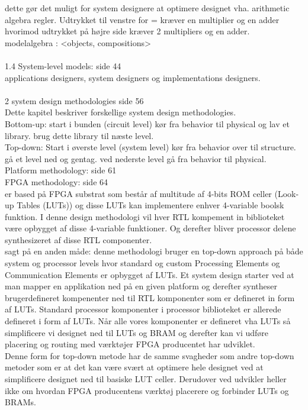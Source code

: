 dette gør det muligt for system designere at optimere designet vha. arithmetic algebra regler. Udtrykket til venstre for = kræver en multiplier og en adder hvorimod udtrykket på højre side kræver 2 multipliers og en adder.\\
modelalgebra : <objects, compositions>\\
\\
1.4 System-level models: side 44\\
applications designers, system designers og implementations designers.\\
\\
2 system design methodologies side 56\\
Dette kapitel beskriver forskellige system design methodologies.\\
Bottom-up: start i bunden (circuit level) kør fra behavior til physical og lav et library. brug dette library til næste level.\\
Top-down: Start i øverste level (system level) kør fra behavior over til structure. gå et level ned og gentag. ved nederste level gå fra behavior til physical.\\
Platform methodology: side 61\\
FPGA methodology: side 64\\
er based på FPGA substrat som består af multitude af 4-bits ROM celler (Look-up Tables (LUTs)) og disse LUTs kan implementere enhver 4-variable boolsk funktion. I denne design methodologi vil hver RTL kompement in biblioteket være opbygget af disse 4-variable funktioner. Og derefter bliver processor delene synthesizeret af disse RTL componenter.\\
sagt på en anden måde: denne methodologi bruger en top-down approach på både system og processor levels hvor standard og custom Processing Elements og Communication Elements er opbygget af LUTs. Et system design starter ved at man mapper en applikation ned på en given platform og derefter syntheser brugerdefineret kompenenter ned til RTL komponenter som er defineret in form af LUTs. Standard processor komponenter i processor biblioteket er allerede defineret i form af LUTs. Når alle vores komponenter er defineret vha LUTs så simplificere vi designet ned til LUTs og BRAM og derefter kan vi udføre placering og routing med værktøjer FPGA producentet har udviklet.\\
Denne form for top-down metode har de samme svagheder som andre top-down metoder som er at det kan være svært at optimere hele designet ved at simplificere designet ned til basiske LUT celler. Derudover ved udvikler heller ikke om hvordan FPGA producentens værktøj placerere og forbinder LUTs og BRAMs.\\


\color{black}






